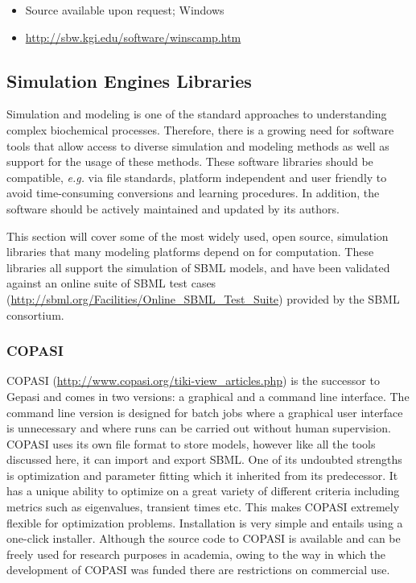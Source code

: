 \begin{itemize}
\item
  Source available upon request; Windows
\item
  \url{http://sbw.kgi.edu/software/winscamp.htm}
\end{itemize}
\subsection{Simulation Engines Libraries}

Simulation and modeling is one of the standard approaches to
understanding complex biochemical processes. Therefore, there is a
growing need for software tools that allow access to diverse simulation
and modeling methods as well as support for the usage of these methods.
These software libraries should be compatible, \emph{e.g.} via file
standards, platform independent and user friendly to avoid
time-consuming conversions and learning procedures. In addition, the
software should be actively maintained and updated by its authors.

This section will cover some of the most widely used, open source,
simulation libraries that many modeling platforms depend on for
computation. These libraries all support the simulation of SBML models,
and have been validated against an online suite of SBML test cases
(\url{http://sbml.org/Facilities/Online_SBML_Test_Suite}) provided by
the SBML consortium.

\subsubsection{COPASI}

COPASI \autocite{hoops2006copasi}
(\url{http://www.copasi.org/tiki-view_articles.php}) is the successor to
Gepasi and comes in two versions: a graphical and a command line
interface. The command line version is designed for batch jobs where a
graphical user interface is unnecessary and where runs can be carried
out without human supervision. COPASI uses its own file format to store
models, however like all the tools discussed here, it can import and
export SBML. One of its undoubted strengths is optimization and
parameter fitting which it inherited from its predecessor. It has a
unique ability to optimize on a great variety of different criteria
including metrics such as eigenvalues, transient times etc. This makes
COPASI extremely flexible for optimization problems. Installation is
very simple and entails using a one-click installer. Although the source
code to COPASI is available and can be freely used for research purposes
in academia, owing to the way in which the development of COPASI was
funded there are restrictions on commercial use.

